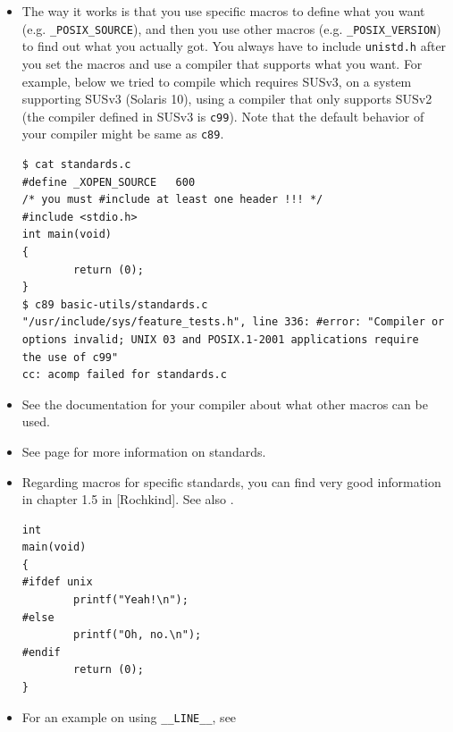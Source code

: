 \begin{itemize}
\item The way it works is that you use specific macros to define what you
want (e.g. \texttt{\_POSIX\_SOURCE}), and then you use other macros (e.g.
\texttt{\_POSIX\_VERSION}) to find out what you actually got.  You always have
to include \texttt{unistd.h} after you set the macros and use a compiler that
supports what you want.  For example, below we tried to compile
 which requires SUSv3, on a system supporting
SUSv3 (Solaris 10), using a compiler that only supports SUSv2 (the compiler
defined in SUSv3 is \texttt{c99}).  Note that the default behavior of your
compiler might be same as \texttt{c89}.

\begin{verbatim}
$ cat standards.c
#define _XOPEN_SOURCE   600
/* you must #include at least one header !!! */
#include <stdio.h>
int main(void)
{
        return (0);
}
$ c89 basic-utils/standards.c
"/usr/include/sys/feature_tests.h", line 336: #error: "Compiler or
options invalid; UNIX 03 and POSIX.1-2001 applications require
the use of c99"
cc: acomp failed for standards.c
\end{verbatim}
\item See the documentation for your compiler about what other macros can be
used.
\item See page \pageref{C_LANGUAGE} for more information on standards.
\item Regarding macros for specific standards, you can find very good
information in chapter 1.5 in [Rochkind]. See also
.

\begin{verbatim}
int
main(void)
{
#ifdef unix
        printf("Yeah!\n");
#else
        printf("Oh, no.\n");
#endif
        return (0);
}
\end{verbatim}
\item For an example on using \texttt{\_\_LINE\_\_}, see
\end{itemize}



